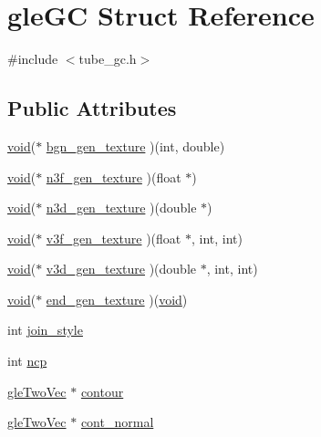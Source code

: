 \hypertarget{structgle_g_c}{\section{gle\-G\-C Struct Reference}
\label{structgle_g_c}
}


{\ttfamily \#include $<$tube\-\_\-gc.\-h$>$}

\subsection*{Public Attributes}
\begin{DoxyCompactItemize}
\item 
\hyperlink{glutf90_8h_ac778d6f63f1aaf8ebda0ce6ac821b56e}{void}($\ast$ \hyperlink{structgle_g_c_ac8d73eb4813e98a7e32496f75ea18caf}{bgn\-\_\-gen\-\_\-texture} )(int, double)
\item 
\hyperlink{glutf90_8h_ac778d6f63f1aaf8ebda0ce6ac821b56e}{void}($\ast$ \hyperlink{structgle_g_c_afdf84824006ad343a2bd492f880e0119}{n3f\-\_\-gen\-\_\-texture} )(float $\ast$)
\item 
\hyperlink{glutf90_8h_ac778d6f63f1aaf8ebda0ce6ac821b56e}{void}($\ast$ \hyperlink{structgle_g_c_a575a4e166c64f64c4bf599c9ead24619}{n3d\-\_\-gen\-\_\-texture} )(double $\ast$)
\item 
\hyperlink{glutf90_8h_ac778d6f63f1aaf8ebda0ce6ac821b56e}{void}($\ast$ \hyperlink{structgle_g_c_a579255f413ffa4680f7e098a89d168a7}{v3f\-\_\-gen\-\_\-texture} )(float $\ast$, int, int)
\item 
\hyperlink{glutf90_8h_ac778d6f63f1aaf8ebda0ce6ac821b56e}{void}($\ast$ \hyperlink{structgle_g_c_ae971242533f826008c0bf49ca6c01d6f}{v3d\-\_\-gen\-\_\-texture} )(double $\ast$, int, int)
\item 
\hyperlink{glutf90_8h_ac778d6f63f1aaf8ebda0ce6ac821b56e}{void}($\ast$ \hyperlink{structgle_g_c_a661bd718e7c074d2b17ff0870ec55cbd}{end\-\_\-gen\-\_\-texture} )(\hyperlink{glutf90_8h_ac778d6f63f1aaf8ebda0ce6ac821b56e}{void})
\item 
int \hyperlink{structgle_g_c_a334385e55e758b8988460d251531ea1f}{join\-\_\-style}
\item 
int \hyperlink{structgle_g_c_ae229caf1e12e35810fb0f4e1f4dfe277}{ncp}
\item 
\hyperlink{tube__gc_8h_a013a1690ab892b020d2d0a5939973103}{gle\-Two\-Vec} $\ast$ \hyperlink{structgle_g_c_ac331873a1785cfcfaadc51d6d48faf9f}{contour}
\item 
\hyperlink{tube__gc_8h_a013a1690ab892b020d2d0a5939973103}{gle\-Two\-Vec} $\ast$ \hyperlink{structgle_g_c_ac5f353ce5d2a7be0a37e7334aded8128}{cont\-\_\-normal}

\end{DoxyCompactItemize}
